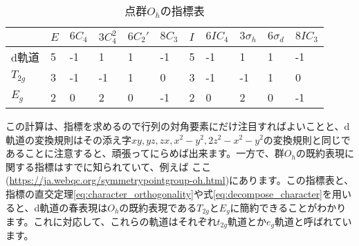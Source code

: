 \documentclass[uplatex,dvipdfmx,a4j]{jsarticle}
\begin{document}
\begin{table}[htbp]
	\centering
	\begin{tabular}{lllllllllll}
			 & $E$ & $6C_4$ & $3C_4^2$ & $6C_2'$ & $8C_3$ & $I$ & $6IC_4$ & $3\sigma_h$ & $6\sigma_d$ & $8IC_3$ \\ \hline
	d軌道      & 5   & -1     & 1        & 1       & -1     & 5   & -1      & 1           & 1           & -1      \\
	$T_{2g}$ & 3   & -1     & -1       & 1       & 0      & 3   & -1      & -1          & 1           & 0       \\
	$E_g$    & 2   & 0      & 2        & 0       & -1     & 2   & 0       & 2           & 0           & -1     
	\end{tabular}
	\caption{点群$O_h$の指標表}
	\label{tab:character_table}
\end{table}

この計算は、指標を求めるので行列の対角要素にだけ注目すればよいことと、d軌道の変換規則はその添え字$xy, yz, zx, x^2-y^2, 2z^2-x^2-y^2$の変換規則と同じであることに注意すると、頑張ってにらめば出来ます。一方で、群$O_h$の既約表現に関する指標はすでに知られていて、例えば	ここ(\url{https://ja.webqc.org/symmetrypointgroup-oh.html})にあります。この指標表と、指標の直交定理\ref{eq:character_orthogonality}や式\ref{eq:decompose_character}を用いると、d軌道の春表現は$O_h$の既約表現である$T_{2g}$と$E_g$に簡約できることがわかります。これに対応して、これらの軌道はそれぞれ$t_{2g}$軌道とか$e_g$軌道と呼ばれています。



\end{document}

